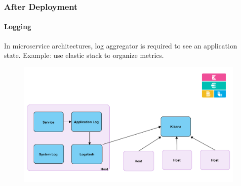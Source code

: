 \documentclass{beamer}
\begin{document}
\begin{frame}
\begin{columns}
\begin{column}{.49\textwidth}
\begin{figure}
\begin{center}
 			\par
		\end{center}
	\end{figure}
\end{column}
\end{columns}
\end{frame}

\begin{frame}
	\frametitle{After Deployment}
	\framesubtitle{Logging}
In microservice architectures, log aggregator is required to see an application state.
\vfill
Example: use elastic stack to organize metrics.
	\begin{figure}
		\begin{center}
			\includegraphics[scale=0.6]{logging}
		\end{center}
	\end{figure}
\end{frame}
\end{document}
